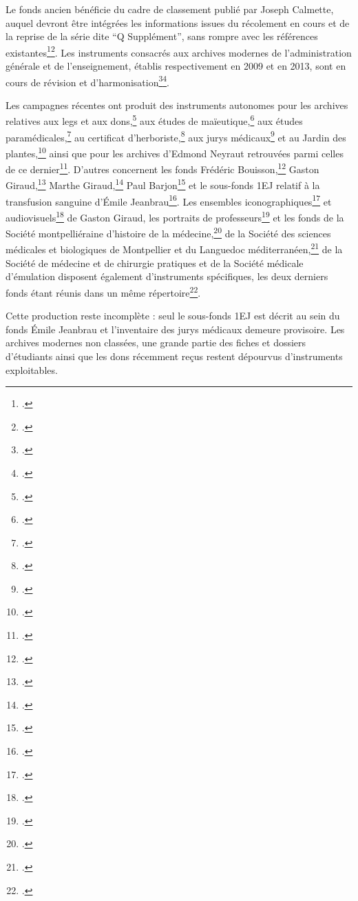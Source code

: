 \clearpage

Le fonds ancien bénéficie du cadre de classement publié par Joseph Calmette, auquel devront être intégrées les informations issues du récolement en cours et de la reprise de la série dite \enquote{Q Supplément}, sans rompre avec les références existantes\footcite{CalmetteCartulaire1912}\footcite{AHFMQSupplement2025}. Les instruments consacrés aux archives modernes de l'administration générale et de l'enseignement, établis respectivement en 2009 et en 2013, sont en cours de révision et d'harmonisation\footcite{Perroud2009FondsModerne}\footcite{Pin2013Enseignement}.

Les campagnes récentes ont produit des instruments autonomes pour les archives relatives aux legs et aux dons,\footcite{Dikoff2025LegsDons} aux études de maïeutique,\footcite{Bertrand2025Maieutique} aux études paramédicales,\footcite{Bertrand2025Paramedical} au certificat d'herboriste,\footcite{Bertrand2025Herboristes} aux jurys médicaux\footcite{Dikoff2026JurysMedicaux} et au Jardin des plantes,\footcite{Fulbert2025JardinPlantes} ainsi que pour les archives d'Edmond Neyraut retrouvées parmi celles de ce dernier\footcite{Bertrand2025Neyraut}. D'autres concernent les fonds Frédéric Bouisson,\footcite{Dikoff2025Bouisson} Gaston Giraud,\footcite{LethielleuxBertrandDikoff2025Giraud} Marthe Giraud,\footcite{BertrandDikoff2025MartheGiraud} Paul Barjon\footcite{BertrandDikoff2025PaulBarjon} et le sous-fonds 1EJ relatif à la transfusion sanguine d'Émile Jeanbrau\footcite{BertrandDikoff2024Jeanbrau}. Les ensembles iconographiques\footcite{LemetayerEtAl2025IconographieGiraud} et audiovisuels\footcite{Bertrand2025AudiovisuelGiraud} de Gaston Giraud, les portraits de professeurs\footcite{Dikoff2025Portraits} et les fonds de la Société montpelliéraine d'histoire de la médecine,\footcite{Bertrand2025SMHM} de la Société des sciences médicales et biologiques de Montpellier et du Languedoc méditerranéen,\footcite{YriarteBertrandDikoff2025SSMB} de la Société de médecine et de chirurgie pratiques et de la Société médicale d'émulation disposent également d'instruments spécifiques, les deux derniers fonds étant réunis dans un même répertoire\footcite{Bertrand2025SocietesSavantes}.

Cette production reste incomplète : seul le sous-fonds 1EJ est décrit au sein du fonds Émile Jeanbrau et l'inventaire des jurys médicaux demeure provisoire. Les archives modernes non classées, une grande partie des fiches et dossiers d'étudiants ainsi que les dons récemment reçus restent dépourvus d'instruments exploitables.

